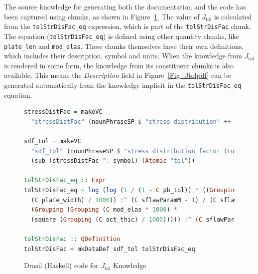 \documentclass[sigconf]{acmart}
\newcommand{\authornt}[3]{\textcolor{#1}{[#3 ---#2]}}
\newcommand{\authornt}[3]{}
\newcommand{\ds}[1]{\authornt{red}{DS}{#1}} %
\newcommand{\jc}[1]{\authornt{magenta}{JC}{#1}} %
\newcommand{\spr}[1]{\authornt{green}{SP}{#1}} %
\newcommand{\jtol}{$J_{\mbox{tol}}$}
\newcommand{\inlHask}[1]{\lstinline[language=Haskell, columns=fullflexible,
  basicstyle=\ttfamily, showstringspaces=false, breaklines=true]{#1}}
\begin{document}


The source knowledge for generating both the documentation and the code has been
captured using chunks, as shown in Figure~\ref{Fig_JtolDrasil}. The value of
\jtol{} is calculated from the {\inlHask{tolStrDisFac_eq}} expression, which is
part of the {\inlHask{tolStrDisFac}} chunk.  The equation ({\inlHask{tolStrDisFac_eq}}) is
defined using other quantity chunks, like {\inlHask{plate_len}} and
{\inlHask{mod_elas}}.  These chunks themselves have their own definitions, which
includes their description, symbol and units.  When the knowledge from \jtol{} is
rendered in some form, the knowledge from its constituent chunks is also
available.  This means the \emph{Description} field in Figure~\ref{Fig_Jtolpdf} 
can be generated automatically from the knowledge implicit in the 
{\inlHask{tolStrDisFac_eq}} equation.

\begin{figure}
\begin{lstlisting}[language=Haskell, frame=single, showstringspaces=false] 
stressDistFac = makeVC 
  "stressDistFac" (nounPhraseSP $ "stress distribution" ++ " factor (Function)") cJ

sdf_tol = makeVC 
  "sdf_tol" (nounPhraseSP $ "stress distribution factor (Function) based on Pbtol") 
  (sub (stressDistFac ^. symbol) (Atomic "tol"))

tolStrDisFac_eq :: Expr
tolStrDisFac_eq = log (log (1 / (1 - C pb_tol)) * ((Grouping ((C plate_len / 1000) * 
  (C plate_width) / 1000)) :^ (C sflawParamM - 1) / (C sflawParamK * 
  (Grouping (Grouping (C mod_elas * 1000) * 
  (square (Grouping (C act_thic) / 1000))))) :^ (C sflawParamM) * (C loadDF))))

tolStrDisFac :: QDefinition
tolStrDisFac = mkDataDef sdf_tol tolStrDisFac_eq
\end{lstlisting}
\caption{Drasil (Haskell) code for \jtol{} Knowledge}
\label{Fig_JtolDrasil}
\end{figure}
\end{document}
